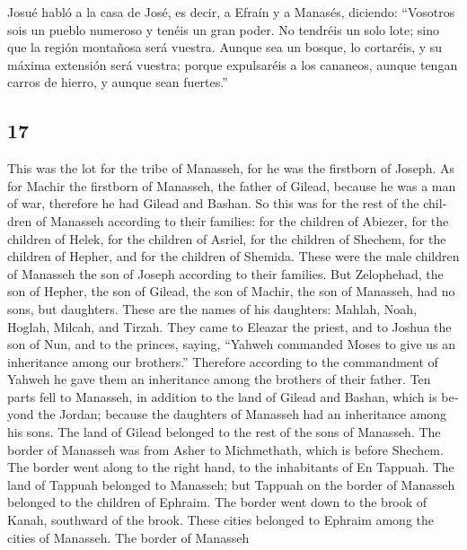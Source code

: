 \begin{paracol}{2}
 Josué habló a la casa de José, es decir, a Efraín y a
Manasés, diciendo: ``Vosotros sois un pueblo numeroso y tenéis un gran
poder. No tendréis un solo lote;  sino que la región
montañosa será vuestra. Aunque sea un bosque, lo cortaréis, y su máxima
extensión será vuestra; porque expulsaréis a los cananeos, aunque tengan
carros de hierro, y aunque sean fuertes.''

\switchcolumn
\begin{otherlanguage}{english}

\hypertarget{section-33}{%
\section{17}\label{section-33}}

 This was the lot for the tribe of Manasseh, for he was
the firstborn of Joseph. As for Machir the firstborn of Manasseh, the
father of Gilead, because he was a man of war, therefore he had Gilead
and Bashan.  So this was for the rest of the children of
Manasseh according to their families: for the children of Abiezer, for
the children of Helek, for the children of Asriel, for the children of
Shechem, for the children of Hepher, and for the children of Shemida.
These were the male children of Manasseh the son of Joseph according to
their families.  But Zelophehad, the son of Hepher, the
son of Gilead, the son of Machir, the son of Manasseh, had no sons, but
daughters. These are the names of his daughters: Mahlah, Noah, Hoglah,
Milcah, and Tirzah.  They came to Eleazar the priest, and
to Joshua the son of Nun, and to the princes, saying, ``Yahweh commanded
Moses to give us an inheritance among our brothers.'' Therefore
according to the commandment of Yahweh he gave them an inheritance among
the brothers of their father.  Ten parts fell to Manasseh,
in addition to the land of Gilead and Bashan, which is beyond the
Jordan;  because the daughters of Manasseh had an
inheritance among his sons. The land of Gilead belonged to the rest of
the sons of Manasseh.  The border of Manasseh was from
Asher to Michmethath, which is before Shechem. The border went along to
the right hand, to the inhabitants of En Tappuah.  The
land of Tappuah belonged to Manasseh; but Tappuah on the border of
Manasseh belonged to the children of Ephraim.  The border
went down to the brook of Kanah, southward of the brook. These cities
belonged to Ephraim among the cities of Manasseh. The border of Manasseh

\end{otherlanguage}
\end{paracol}
